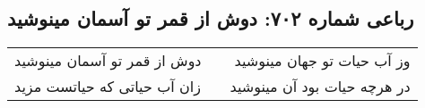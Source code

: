 \begin{center}
\section*{رباعی شماره ۷۰۲: دوش از قمر تو آسمان مینوشید}
\label{sec:0702}
\begin{longtable}{l p{0.5cm} r}
دوش از قمر تو آسمان مینوشید
&&
وز آب حیات تو جهان مینوشید
\\
زان آب حیاتی که حیاتست مزید
&&
در هرچه حیات بود آن مینوشید
\\
\end{longtable}
\end{center}

